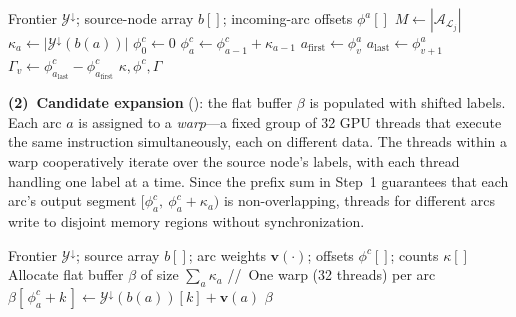 \documentclass[letterpaper]{article}
\begin{document}
\begin{algorithm}[tbp]
\caption{GPU Subroutine: Compute Arc Offsets}
\label{alg:compute_arc_offsets}
\begin{algorithmic}[1]
\Require Frontier $\mathcal{Y}^{\downarrow}$; source-node array $b[]$; incoming-arc offsets $\phi^a[]$
\State $M \gets |\mathcal{A}_{\mathcal{L}_j}|$ 
 
    \State $\kappa_a \gets |\mathcal{Y}^{\downarrow}(b(a))|$
\EndFor
\State $\phi^c_0 \gets 0$
    \State $\phi^c_a \gets \phi^c_{a-1} + \kappa_{a-1}$
\EndFor
{}
    \State $a_{\text{first}} \gets \phi^a_v$
    \State $a_{\text{last}} \gets \phi^a_{v{+}1}$
    \State $\Gamma_v \gets \phi^c_{a_{\text{last}}} - \phi^c_{a_{\text{first}}}$ 
\EndFor
\State \Return $\kappa, \phi^c, \Gamma$
\EndProcedure
\end{algorithmic}
\end{algorithm}

\textbf{(2)~Candidate expansion} (): the flat buffer $\beta$ is populated with shifted labels. Each arc $a$ is assigned to a \emph{warp}---a fixed group of 32 GPU threads that execute the same instruction simultaneously, each on different data. The threads within a warp cooperatively iterate over the source node's labels, with each thread handling one label at a time. Since the prefix sum in Step~1 guarantees that each arc's output segment $[\phi^c_a,\ \phi^c_a + \kappa_a)$ is non-overlapping, threads for different arcs write to disjoint memory regions without synchronization.

\begin{algorithm}[tbp]
\caption{GPU Subroutine: Expand Candidates into Flat Buffer}
\label{alg:expand_candidates}
\begin{algorithmic}[1]
\Require Frontier $\mathcal{Y}^{\downarrow}$; source array $b[]$; arc weights $\mathbf{v}(\cdot)$; offsets $\phi^c[]$; counts $\kappa[]$
\State Allocate flat buffer $\beta$ of size $\sum_a \kappa_a$
    \State //~One warp (32 threads) per arc
        \State $\beta[\,\phi^c_a + k\,] \gets \mathcal{Y}^{\downarrow}(b(a))[k] + \mathbf{v}(a)$
    \EndFor
\EndFor
\State \Return $\beta$
\EndProcedure
\end{algorithmic}
\end{algorithm}
\end{document}
